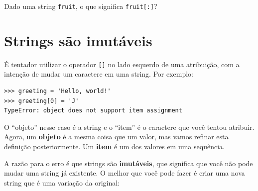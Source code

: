 {\begin{ex}
Dado uma string {\tt fruit}, o que significa {\tt fruit[:]}?
\end{ex}

\section{Strings são imutáveis}

É tentador utilizar o operador {\tt []} no lado esquerdo de uma atribuição,
com a intenção de mudar um caractere em uma string. Por exemplo:

\beforeverb
\begin{verbatim}
>>> greeting = 'Hello, world!'
>>> greeting[0] = 'J'
TypeError: object does not support item assignment
\end{verbatim}
\afterverb
%
%
O ``objeto'' nesse caso é a string e o ``item'' é o caractere que você tentou
atribuir. Agora, um {\bf objeto} é a mesma coisa que um valor, mas vamos
refinar esta definição posteriormente. Um {\bf item} é um dos valores em uma
sequência.


A razão para o erro é que strings são {\bf imutáveis}, que significa que você
não pode mudar uma string já existente. O melhor que você pode fazer é criar
uma nova string que é uma variação da original:

}
